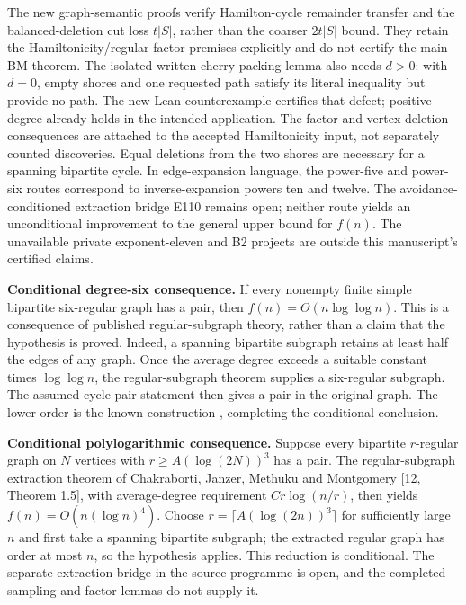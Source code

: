 \documentclass[smallextended]{svjour3}
\newcounter{none} %
\begin{document}
The new graph-semantic proofs verify Hamilton-cycle remainder transfer
and the balanced-deletion cut loss \(t|S|\), rather than the coarser
\(2t|S|\) bound. They retain the Hamiltonicity/regular-factor premises
explicitly and do not certify the main BM theorem. The isolated written
cherry-packing lemma also needs \(d>0\): with \(d=0\), empty shores and
one requested path satisfy its literal inequality but provide no path.
The new Lean counterexample certifies that defect; positive degree
already holds in the intended application. The factor and
vertex-deletion consequences are attached to the accepted Hamiltonicity
input, not separately counted discoveries. Equal deletions from the two
shores are necessary for a spanning bipartite cycle. In edge-expansion
language, the power-five and power-six routes correspond to
inverse-expansion powers ten and twelve. The avoidance-conditioned
extraction bridge E110 remains open; neither route yields an
unconditional improvement to the general upper bound for \(f(n)\). The
unavailable private exponent-eleven and B2 projects are outside this
manuscript's certified claims.

\textbf{Conditional degree-six consequence.} If every nonempty finite
simple bipartite six-regular graph has a pair, then
\(f(n)=\Theta(n\log\log n)\). This is a consequence of published
regular-subgraph theory, rather than a claim that the hypothesis is
proved. Indeed, a spanning bipartite subgraph retains at least half the
edges of any graph. Once the average degree exceeds a suitable constant
times \(\log\log n\), the regular-subgraph theorem \cite{ref4} supplies a
six-regular subgraph. The assumed cycle-pair statement then gives a pair
in the original graph. The lower order is the known construction
\cite{ref3}, completing the conditional conclusion.

\textbf{Conditional polylogarithmic consequence.} Suppose every
bipartite \(r\)-regular graph on \(N\) vertices with
\(r\ge A(\log(2N))^3\) has a pair. The regular-subgraph extraction
theorem of Chakraborti, Janzer, Methuku and Montgomery {[}12, Theorem
1.5{]}, with average-degree requirement \(Cr\log(n/r)\), then yields
\(f(n)=O(n(\log n)^4)\). Choose \(r=\lceil A(\log(2n))^3\rceil\) for
sufficiently large \(n\) and first take a spanning bipartite subgraph;
the extracted regular graph has order at most \(n\), so the hypothesis
applies. This reduction is conditional. The separate extraction bridge
in the source programme is open, and the completed sampling and factor
lemmas do not supply it.
\end{document}
